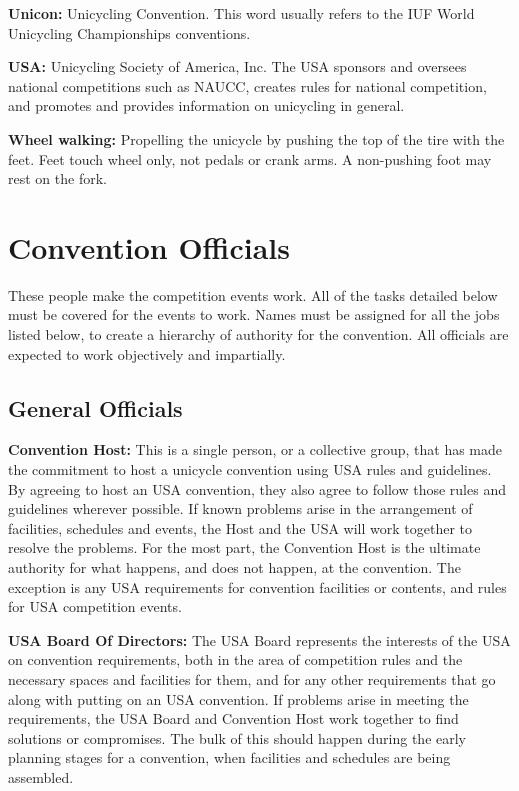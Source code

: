 \textbf{Unicon:} Unicycling Convention.
This word usually refers to the IUF World Unicycling Championships conventions.

\textbf{USA:} Unicycling Society of America, Inc.
The USA sponsors and oversees national competitions such as NAUCC, creates rules for national competition, and promotes and provides information on unicycling in general.

\textbf{Wheel walking:} Propelling the unicycle by pushing the top of the tire with the feet.
Feet touch wheel only, not pedals or crank arms.
A non-pushing foot may rest on the fork.


\chapter{Convention Officials}
These people make the competition events work.
All of the tasks detailed below must be covered for the events to work.
Names must be assigned for all the jobs listed below, to create a hierarchy of authority for the convention.
All officials are expected to work objectively and impartially.

\section{General Officials}
\textbf{Convention Host:} This is a single person, or a collective group, that has made the commitment to host a unicycle convention using USA rules and guidelines.
By agreeing to host an USA convention, they also agree to follow those rules and guidelines wherever possible.
If known problems arise in the arrangement of facilities, schedules and events, the Host and the USA will work together to resolve the problems.
For the most part, the Convention Host is the ultimate authority for what happens, and does not happen, at the convention.
The exception is any USA requirements for convention facilities or contents, and rules for USA competition events.

\textbf{USA Board Of Directors:} The USA Board represents the interests of the USA on convention requirements, both in the area of competition rules and the necessary spaces and facilities for them, and for any other requirements that go along with putting on an USA convention.
If problems arise in meeting the requirements, the USA Board and Convention Host work together to find solutions or compromises.
The bulk of this should happen during the early planning stages for a convention, when facilities and schedules are being assembled.

